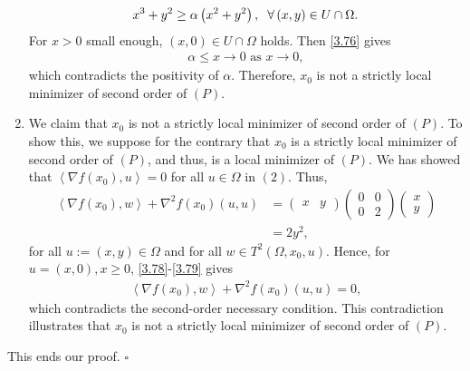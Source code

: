 \documentclass[a4paper]{article}
\numberwithin{equation}{section}
\begin{document}
\begin{enumerate}
\begin{align}
\label{3.76}
{x^3} + {y^2} \ge \alpha \left( {{x^2} + {y^2}} \right),\hspace{0.2cm}\forall \left( {x,y} \right) \in U \cap \Omega .
\end{align}
For $x>0$ small enough, $\left( x,0 \right) \in U \cap \Omega $ holds. Then \eqref{3.76} gives
\begin{align}
\alpha  \le x \to 0\mbox{ as } x \to 0,
\end{align}
which contradicts the positivity of $\alpha$. Therefore, $x_0$ is not a strictly local minimizer of second order of $\left(P\right)$.
\item We claim that $x_0$ is not a strictly local minimizer of second order of $\left(P\right)$. To show this, we suppose for the contrary that $x_0$ is a strictly local minimizer of second order of $\left(P\right)$, and thus, is a local minimizer of $\left(P\right)$. We has showed that $\left\langle {\nabla f\left( {{x_0}} \right),u} \right\rangle  = 0$ for all $u \in \Omega$ in $\left(2\right)$. Thus,
\begin{align}
\label{3.78}
\left\langle {\nabla f\left( {{x_0}} \right),w} \right\rangle  + {\nabla ^2}f\left( {{x_0}} \right)\left( {u,u} \right) &= \left( {\begin{array}{*{20}{c}}
x&y
\end{array}} \right)\left( {\begin{array}{*{20}{c}}
0&0\\
0&2
\end{array}} \right)\left( {\begin{array}{*{20}{c}}
x\\
y
\end{array}} \right)\\
& = 2{y^2}, \label{3.79}
\end{align}
for all $u:=\left(x,y\right) \in \Omega$ and for all $w\in T^2\left(\Omega,x_0,u\right)$. Hence, for $u=\left(x,0\right),x\ge 0$, \eqref{3.78}-\eqref{3.79} gives
\begin{align}
\left\langle {\nabla f\left( {{x_0}} \right),w} \right\rangle  + {\nabla ^2}f\left( {{x_0}} \right)\left( {u,u} \right) = 0,
\end{align}
which contradicts the second-order necessary condition. This contradiction illustrates that $x_0$ is not a strictly local minimizer of second order of $\left(P\right)$.
\end{enumerate}
This ends our proof. \hfill $\square$\\
\end{document}
